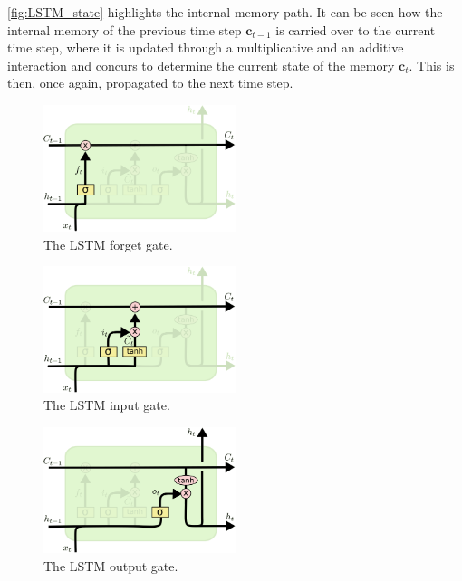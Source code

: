 \autoref{fig:LSTM_state} highlights the internal memory path. It can be seen
how the internal memory of the previous time step $\mathbf{c}_{t-1}$ is carried
over to the current time step, where it is updated through a multiplicative and
an additive interaction and concurs to determine the current state of the
memory $\mathbf{c}_t$. This is then, once again, propagated to the next time
step.

\begin{figure}[p]
    \centering
    \includegraphics[width=0.5\textwidth]{pdf/LSTM_forget_gate.pdf}
    \caption{The LSTM forget gate.\label{fig:LSTM_forget_gate}}
\end{figure}
\begin{figure}[p]
    \centering
    \includegraphics[width=0.5\textwidth]{pdf/LSTM_input_gate.pdf}
    \caption{The LSTM input gate.\label{fig:LSTM_input_gate}}
\end{figure}
\begin{figure}[p]
    \centering
    \includegraphics[width=0.5\textwidth]{pdf/LSTM_output_gate.pdf}
    \caption{The LSTM output gate.\label{fig:LSTM_output_gate}}
\end{figure}

